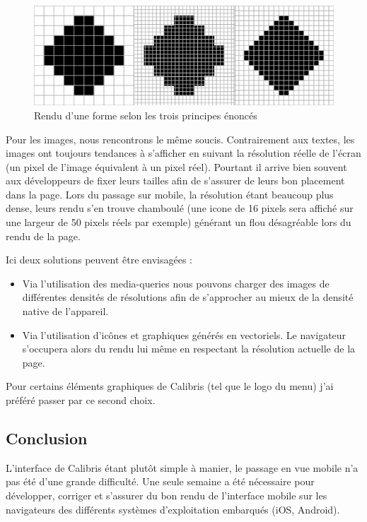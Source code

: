 \documentclass[12pt,a4paper]{book}
\begin{document}
\begin{figure}[htp]
\centering
\includegraphics[scale=0.9]{img/reso1.png}
 \caption{Rendu d'une forme selon les trois principes énoncés}
 \label{fig.resolution}
\end{figure}

Pour les images, nous rencontrons le même soucis. Contrairement aux textes, les images ont toujours tendances à s'afficher en suivant la résolution réelle de l'écran (un pixel de l'image équivalent à un pixel réel). Pourtant il arrive bien souvent aux développeurs de fixer leurs tailles afin de s'assurer de leurs bon placement dans la page. Lors du passage sur mobile, la résolution étant beaucoup plus dense, leurs rendu s'en trouve chamboulé (une icone de 16 pixels sera affiché sur une largeur de 50 pixels réels par exemple) générant un flou désagréable lors du rendu de la page.

Ici deux solutions peuvent être envisagées :
\begin{itemize}
  \item Via l'utilisation des media-queries nous pouvons charger des images de différentes densités de résolutions afin de s'approcher au mieux de la densité native de l'appareil. 
  \item Via l'utilisation d'icônes et graphiques générés en vectoriels. Le navigateur s'occupera alors du rendu lui même en respectant la résolution actuelle de la page.
\end{itemize}

Pour certains éléments graphiques de Calibris (tel que le logo du menu) j'ai préféré passer par ce second choix.

\subsection*{Conclusion}

L'interface de Calibris étant plutôt simple à manier, le passage en vue mobile n'a pas été d'une grande difficulté. Une seule semaine a été nécessaire pour développer, corriger et s'assurer du bon rendu de l'interface mobile sur les navigateurs des différents systèmes d'exploitation embarqués (iOS, Android).
\end{document}
